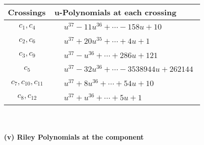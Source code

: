 \documentclass[1p]{elsarticle_modified}
\theoremstyle{definition}
\begin{document}
\begin{tabular}{m{50pt}|m{274pt}}
Crossings & \hspace{64pt}u-Polynomials at each crossing \\
\hline $$\begin{aligned}c_{1},c_{4}\end{aligned}$$&$\begin{aligned}
&u^{37}-11 u^{36}+\cdots-158 u+10
\end{aligned}$\\
\hline $$\begin{aligned}c_{2},c_{6}\end{aligned}$$&$\begin{aligned}
&u^{37}+20 u^{35}+\cdots+4 u+1
\end{aligned}$\\
\hline $$\begin{aligned}c_{3},c_{9}\end{aligned}$$&$\begin{aligned}
&u^{37}- u^{36}+\cdots+286 u+121
\end{aligned}$\\
\hline $$\begin{aligned}c_{5}\end{aligned}$$&$\begin{aligned}
&u^{37}-32 u^{36}+\cdots-3538944 u+262144
\end{aligned}$\\
\hline $$\begin{aligned}c_{7},c_{10},c_{11}\end{aligned}$$&$\begin{aligned}
&u^{37}+8 u^{36}+\cdots+54 u+10
\end{aligned}$\\
\hline $$\begin{aligned}c_{8},c_{12}\end{aligned}$$&$\begin{aligned}
&u^{37}+u^{36}+\cdots+5 u+1
\end{aligned}$\\
\hline
\end{tabular}\\~\\
\newpage\renewcommand{\arraystretch}{1}
\flushleft \textbf{(v) Riley Polynomials at the component}\newline \\
\end{document}
